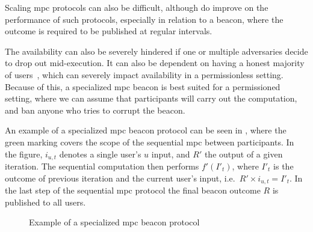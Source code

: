 Scaling \gls{mpc} protocols can also be difficult, although  do improve on the performance of such protocols, especially in relation to a beacon, where the outcome is required to be published at regular intervals.

The availability can also be severely hindered if one or multiple adversaries decide to drop out mid-execution.
It can also be dependent on having a honest majority of users~\cite{cascudo2017scrape}, which can severely impact availability in a permissionless setting.
Because of this, a specialized \gls{mpc} beacon is best suited for a permissioned setting, where we can assume that participants will carry out the computation, and ban anyone who tries to corrupt the beacon.

An example of a specialized \gls{mpc} beacon protocol can be seen in , where the green marking covers the scope of the sequential \gls{mpc} between participants.
In the figure, $i_{u,t}$ denotes a single user's $u$ input, and $R'$ the output of a given iteration.
The sequential computation then performs $f'(I'_t)$, where $I'_t$ is the outcome of previous iteration and the current user's input, i.e.\ $R' \times i_{u,t} = I'_t$.
In the last step of the sequential \gls{mpc} protocol the final beacon outcome $R$ is published to all users.

\begin{figure*}[hbt]
    \centering
    \footnotesize
    \caption{Example of a specialized \gls{mpc} beacon protocol}\label{fig:mpc_beacon}
\end{figure*}


